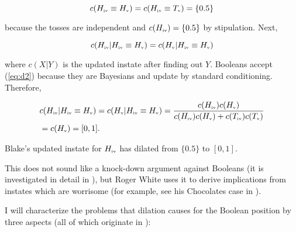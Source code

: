 \documentclass[12pt]{article}
\begin{document}
\begin{equation}
  \label{eq:d1}
  c(H_{\mbox{\tiny{iv}}}\equiv{}H_{\mbox{\tiny{v}}})=c(H_{\mbox{\tiny{iv}}}\equiv{}T_{\mbox{\tiny{v}}})=\{0.5\}
\end{equation}

because the tosses are independent and
$c(H_{\mbox{\tiny{iv}}})=\{0.5\}$ by stipulation. Next,

\begin{equation}
  \label{eq:d2}
  c(H_{\mbox{\tiny{iv}}}|H_{\mbox{\tiny{iv}}}\equiv{}H_{\mbox{\tiny{v}}})=c(H_{\mbox{\tiny{v}}}|H_{\mbox{\tiny{iv}}}\equiv{}H_{\mbox{\tiny{v}}})
\end{equation}

where $c(X|Y)$ is the updated instate after finding out $Y$. Booleans
accept (\ref{eq:d2}) because they are Bayesians and update by standard
conditioning. Therefore,

\begin{align}
  \label{eq:d3}
  &c(H_{\mbox{\tiny{iv}}}|H_{\mbox{\tiny{iv}}}\equiv{}H_{\mbox{\tiny{v}}})=c(H_{\mbox{\tiny{v}}}|H_{\mbox{\tiny{iv}}}\equiv{}H_{\mbox{\tiny{v}}})=\frac{c(H_{\mbox{\tiny{iv}}})c(H_{\mbox{\tiny{v}}})}{c(H_{\mbox{\tiny{iv}}})c(H_{\mbox{\tiny{v}}})+c(T_{\mbox{\tiny{iv}}})c(T_{\mbox{\tiny{v}}})} \notag \\
  &=c(H_{\mbox{\tiny{v}}})=[0,1].
\end{align}

Blake's updated instate for $H_{\mbox{\tiny{iv}}}$ has dilated from
$\{0.5\}$ to $[0,1]$.

This does not sound like a knock-down argument against Booleans (it is
investigated in detail in ), but
Roger White uses it to derive implications from instates which are
worrisome (for example, see his Chocolates case in
).

I will characterize the problems that dilation causes for the Boolean
position by three aspects (all of which originate in
):
\end{document}
